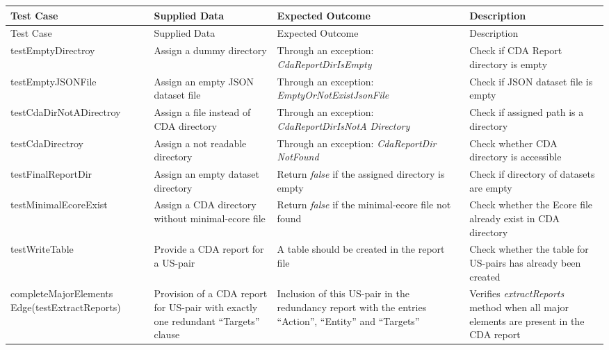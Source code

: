 		\begin{tabularx}{\textwidth}{X  X  X  X}		
			\hline
			Test Case &Supplied Data&Expected Outcome&Description\\
			\hline\hline
			\endfirsthead
			\hline
			Test Case &Supplied Data&Expected Outcome&Description\\
			\hline\hline
			\endhead
			testEmptyDirectroy&Assign a dummy directory&Through an exception: \textit{CdaReportDirIsEmpty}&Check if CDA Report directory is empty\\
			
			testEmptyJSONFile&Assign an empty JSON dataset file&Through an exception: \textit{EmptyOrNotExistJsonFile}&Check if JSON dataset file is empty\\
			
			testCdaDirNotADirectroy&Assign a file instead of CDA directory&Through an exception: \textit{CdaReportDirIsNotA Directory}&Check if assigned path is a directory\\
			
			testCdaDirectroy&Assign a not readable directory&Through an exception: \textit{CdaReportDir NotFound}&Check whether CDA directory is accessible\\
			
			testFinalReportDir&Assign an empty dataset directory&Return \textit{false} if the assigned directory is empty&Check if directory of datasets are empty\\
			
			testMinimalEcoreExist&Assign a CDA directory without minimal-ecore file&Return \textit{false} if the minimal-ecore file not found&Check whether the Ecore file already exist in CDA directory\\
			
			testWriteTable&Provide a CDA report for a US-pair&A table should be created in the report file&Check whether the table for US-pairs has already been created\\
			
			completeMajorElements \newline Edge\newline(testExtractReports)&Provision of a CDA report for US-pair with exactly one redundant \enquote{Targets} clause&Inclusion of this US-pair in the redundancy report with the entries \enquote{Action}, \enquote{Entity} and \enquote{Targets} &Verifies \textit{extractReports} method when all major elements are present in the CDA report\\
			

\end{tabularx}
